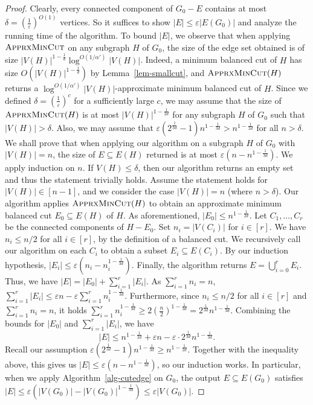 \documentclass[11pt]{article}
\begin{document}
\begin{proof}
Clearly, every connected component of $G_0 - E$ contains at most $\delta = (\frac{1}{\varepsilon})^{O(1)}$ vertices.
So it suffices to show $|E| \leq \varepsilon |E(G_0)|$ and analyze the running time of the algorithm.
To bound $|E|$, we observe that when applying $\textsc{ApprxMinCut}$ on any subgraph $H$ of $G_0$, the size of the edge set obtained is of size $|V(H)|^{1-\frac{1}{d}} \log^{O(1/\alpha')} |V(H)|$.
Indeed, a minimum balanced cut of $H$ has size $O(|V(H)|^{1-\frac{1}{d}})$ by Lemma~\ref{lem-smallcut}, and $\textsc{ApprxMinCut}(H)$ returns a $\log^{O(1/\alpha')} |V(H)|$-approximate minimum balanced cut of $H$.
Since we defined $\delta = (\frac{1}{\varepsilon})^c$ for a sufficiently large $c$, we may assume that the size of $\textsc{ApprxMinCut}(H)$ is at most $|V(H)|^{1-\frac{1}{2d}}$ for any subgraph $H$ of $G_0$ such that $|V(H)| > \delta$.
Also, we may assume that $\varepsilon (2^{\frac{1}{3d}}-1) n^{1-\frac{1}{3d}} > n^{1-\frac{1}{2d}}$ for all $n > \delta$.
We shall prove that when applying our algorithm on a subgraph $H$ of $G_0$ with $|V(H)|=n$, the size of $E \subseteq E(H)$ returned is at most $\varepsilon (n - n^{1-\frac{1}{3d}})$.
We apply induction on $n$.
If $V(H) \leq \delta$, then our algorithm returns an empty set and thus the statement trivially holds.
Assume the statement holds for $|V(H)| \in [n-1]$, and we consider the case $|V(H)| = n$ (where $n > \delta$).
Our algorithm applies $\textsc{ApprxMinCut}(H)$ to obtain an approximate minimum balanced cut $E_0 \subseteq E(H)$ of $H$.
As aforementioned, $|E_0| \leq n^{1-\frac{1}{2d}}$.
Let $C_1,\dots,C_r$ be the connected components of $H - E_0$.
Set $n_i = |V(C_i)|$ for $i \in [r]$.
We have $n_i \leq n/2$ for all $i \in [r]$, by the definition of a balanced cut.
We recursively call our algorithm on each $C_i$ to obtain a subset $E_i \subseteq E(C_i)$.
By our induction hypothesis, $|E_i| \leq \varepsilon(n_i - n_i^{1-\frac{1}{3d}})$.
Finally, the algorithm returns $E = \bigcup_{i=0}^r E_i$.
Thus, we have $|E| = |E_0| + \sum_{i=1}^r |E_i|$.
As $\sum_{i=1}^r n_i = n$, $\sum_{i=1}^r |E_i| \leq \varepsilon n - \varepsilon \sum_{i=1}^r n_i^{1-\frac{1}{3d}}$.
Furthermore, since $n_i \leq n/2$ for all $i \in [r]$ and $\sum_{i=1}^r n_i = n$, it holds $\sum_{i=1}^r n_i^{1-\frac{1}{3d}} \geq 2(\frac{n}{2})^{1-\frac{1}{3d}} = 2^{\frac{1}{3d}} n^{1-\frac{1}{3d}}$.
Combining the bounds for $|E_0|$ and $\sum_{i=1}^r |E_i|$, we have
\begin{equation*}
    |E| \leq n^{1-\frac{1}{2d}} + \varepsilon n - \varepsilon \cdot 2^{\frac{1}{3d}} n^{1-\frac{1}{3d}}.
\end{equation*}
Recall our assumption $\varepsilon (2^{\frac{1}{3d}}-1) n^{1-\frac{1}{3d}} \geq n^{1-\frac{1}{2d}}$.
Together with the inequality above, this gives us $|E| \leq \varepsilon (n - n^{1-\frac{1}{3d}})$, so our induction works.
In particular, when we apply Algorithm~\ref{alg-cutedge} on $G_0$, the output $E \subseteq E(G_0)$ satisfies $|E| \leq \varepsilon (|V(G_0)| - |V(G_0)|^{1-\frac{1}{3d}}) \leq \varepsilon |V(G_0)|$.


\end{proof}
\end{document}
